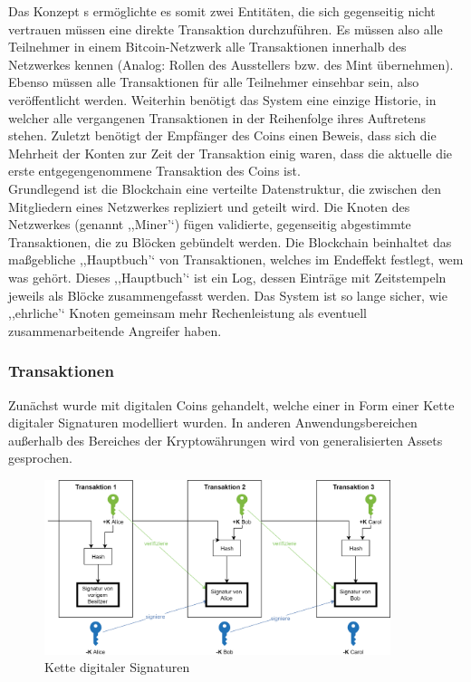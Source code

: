     Das Konzept \citeauthor{Nakamoto2008}s ermöglichte es somit zwei Entitäten, die sich gegenseitig nicht vertrauen müssen eine direkte Transaktion durchzuführen.
    Es müssen also alle Teilnehmer in einem Bitcoin-Netzwerk alle Transaktionen innerhalb des Netzwerkes kennen (Analog: Rollen des Ausstellers bzw. des Mint übernehmen).
    Ebenso müssen alle Transaktionen für alle Teilnehmer einsehbar sein, also veröffentlicht werden.
    Weiterhin benötigt das System eine einzige Historie, in welcher alle vergangenen Transaktionen in der Reihenfolge ihres Auftretens stehen.
    Zuletzt benötigt der Empfänger des Coins einen Beweis, dass sich die Mehrheit der Konten zur Zeit der Transaktion einig waren, dass die aktuelle die erste entgegengenommene Transaktion des Coins ist. 
    \cite{Nakamoto2008}
    \medskip\\
    
    \noindent Grundlegend ist die Blockchain eine verteilte Datenstruktur, die zwischen den Mitgliedern eines Netzwerkes repliziert und geteilt wird\cite{Christidis2016}.
    Die Knoten des Netzwerkes (genannt ,,Miner'`) fügen validierte, gegenseitig abgestimmte Transaktionen, die zu Blöcken gebündelt werden.
    Die Blockchain beinhaltet das maßgebliche ,,Hauptbuch'` von Transaktionen, welches im Endeffekt festlegt, wem was gehört.
    Dieses ,,Hauptbuch'` ist ein Log, dessen Einträge mit Zeitstempeln jeweils als Blöcke zusammengefasst werden.
    Das System ist so lange sicher, wie ,,ehrliche'` Knoten gemeinsam mehr Rechenleistung als eventuell zusammenarbeitende Angreifer haben\cite{Nakamoto2008}.
    
    \subsubsection{Transaktionen}
	    Zunächst wurde mit digitalen Coins gehandelt, welche einer in Form einer Kette digitaler Signaturen modelliert wurden\cite{Nakamoto2008}.
	    In anderen Anwendungsbereichen außerhalb des Bereiches der Kryptowährungen wird von generalisierten Assets gesprochen.
	    \begin{figure}[H]
	    	\centering
	    	\includegraphics[width=0.9\textwidth]{graphics/transaction.png}
	    	\caption{Kette digitaler Signaturen}
	    	\label{fig:txio}
	    \end{figure}
    
